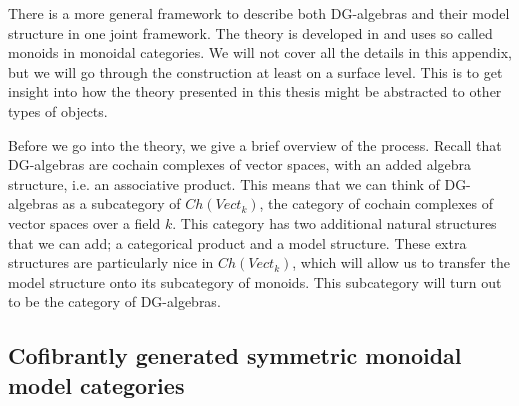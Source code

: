 

There is a more general framework to describe both DG-algebras and their model structure in one joint framework. The theory is developed in \cite{monoid} and uses so called monoids in monoidal categories. We will not cover all the details in this appendix, but we will go through the construction at least on a surface level. This is to get insight into how the theory presented in this thesis might be abstracted to other types of objects. 

Before we go into the theory, we give a brief overview of the process. Recall that DG-algebras are cochain complexes of vector spaces, with an added algebra structure, i.e. an associative product. This means that we can think of DG-algebras as a subcategory of $Ch(Vect_k)$, the category of cochain complexes of vector spaces over a field $k$. This category has two additional natural structures that we can add; a categorical product and a model structure. These extra structures are particularly nice in $Ch(Vect_k)$, which will allow us to transfer the model structure onto its subcategory of monoids. This subcategory will turn out to be the category of DG-algebras.  



\subsection*{Cofibrantly generated symmetric monoidal model categories}

